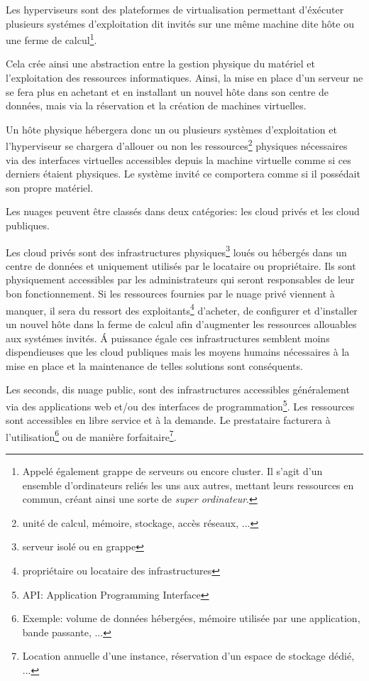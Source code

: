 \documentclass[11pt, a4paper ]{article}
\begin{document}
Les hyperviseurs sont des plateformes de virtualisation permettant d'éxécuter plusieurs systémes d'exploitation dit invités sur une même machine dite hôte ou une ferme de calcul\footnote{Appelé également grappe de serveurs ou encore cluster. Il s'agit d'un ensemble d'ordinateurs reliés les uns aux autres, mettant leurs ressources en commun, créant ainsi une sorte de \emph{super ordinateur}. }.

Cela crée ainsi une abstraction entre la gestion physique du matériel et l'exploitation des ressources informatiques. Ainsi, la mise en place d'un serveur ne se fera plus en achetant et en installant un nouvel hôte dans son centre de données, mais via la réservation et la création de machines virtuelles.

Un hôte physique hébergera donc un ou plusieurs systèmes d'exploitation et l'hyperviseur se chargera d'allouer ou non les ressources\footnote{unité de calcul, mémoire, stockage, accès réseaux, ...}  physiques nécessaires via des interfaces virtuelles accessibles depuis la machine virtuelle comme si ces derniers étaient physiques. Le système invité ce comportera comme si il possédait son propre matériel.

Les nuages peuvent être classés dans deux catégories: les cloud privés et les cloud publiques.


Les cloud privés sont des infrastructures physiques\footnote{serveur isolé ou en grappe} loués ou hébergés dans un centre de données et uniquement utilisés par le locataire ou propriétaire. Ils sont physiquement accessibles par les administrateurs qui seront responsables de leur bon fonctionnement. Si les ressources fournies par le nuage privé viennent à manquer, il sera du ressort des exploitants\footnote{propriétaire ou locataire des infrastructures} d'acheter, de configurer et d'installer un nouvel hôte dans la ferme de calcul afin d'augmenter les ressources allouables aux systémes invités. Á puissance égale ces infrastructures semblent moins dispendieuses que les cloud publiques mais les moyens humains nécessaires à la mise en place et la maintenance de telles solutions sont conséquents.

Les seconds, dis nuage public, sont des infrastructures accessibles généralement via des applications web et/ou des interfaces de programmation\footnote{API: Application Programming Interface}. Les ressources sont accessibles en libre service et à la demande. Le prestataire facturera à l'utilisation\footnote{Exemple: volume de données hébergées, mémoire utilisée par une application, bande passante, ...} ou de manière forfaitaire\footnote{Location annuelle d'une instance, réservation d'un espace de stockage dédié, ...}.
\end{document}
